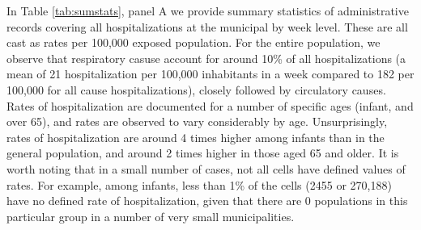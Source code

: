 \documentclass[11pt]{article}
\begin{document}
\begin{spacing}{1.5}

In Table \ref{tab:sumstats}, panel A we provide summary statistics of administrative records covering all hospitalizations at the municipal by week level. These are all cast as rates per 100,000 exposed population.  For the entire population, we observe that respiratory casuse account for around 10\% of all hospitalizations (a mean of 21 hospitalization per 100,000 inhabitants in a week compared to 182 per 100,000 for all cause hospitalizations), closely followed by circulatory causes.  Rates of hospitalization are documented for a number of specific ages (infant, and over 65), and rates are observed to vary considerably by age.  Unsurprisingly, rates of hospitalization are around 4 times higher among infants than in the general population, and around 2 times higher in those aged 65 and older.  It is worth noting that in a small number of cases, not all cells have defined values of rates.  For example, among infants, less than 1\% of the cells (2455 or 270,188) have no defined rate of hospitalization, given that there are 0 populations in this particular group in a number of very small municipalities.  %



\end{spacing}
\end{document}
